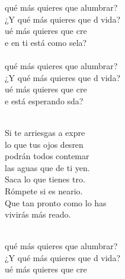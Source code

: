 \documentclass[12pt]{article}
\begin{document}
 
    \sffamily

    \begin{multicols}{2}

        \begin{cancion}%
            \begin{chorus}%
             qué más quieres que alumbrar?\\
            ¿Y qué más quieres que d vida?\\
            ué más quieres que cre \\
            e en ti está como sela?\\
        \jump\\
             qué más quieres que alumbrar?\\
            ¿Y qué más quieres que d vida?\\
            ué más quieres que cre \\
            e está esperando sda?\\
            \end{chorus}%
            \jump\\
            Si te arriesgas a expre \\
            lo que tus ojos desren\\
            podrán todos contemar\\
            las aguas que de ti yen.\\
            Saca lo que tienes tro. \\
            Rómpete si es neario.\\
            Que tan pronto como lo has \\
            vivirás más reado.\\\jump\\
            \begin{chorus}%
             qué más quieres que alumbrar?\\
            ¿Y qué más quieres que d vida?\\
            ué más quieres que cre \\

\end{chorus}
\end{cancion}
\end{multicols}
\end{document}
